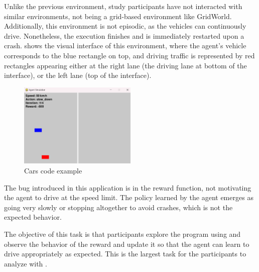 Unlike the previous environment, study participants have not interacted with similar environments, 
not being a grid-based environment like GridWorld. Additionally, this environment is not episodic, as 
the vehicles can continuously drive. Nonetheless, the execution finishes and is immediately restarted 
upon a crash.  shows the visual interface of this environment, where the 
agent's vehicle corresponds to the blue rectangle on top, and driving traffic is represented by red 
rectangles appearing either at the right lane (the driving lane at bottom of the interface), or the left lane 
(top of the interface).

\begin{figure}[hptb]
    \centering
    \includegraphics[width=0.5\textwidth]{figures/cars_example.png}
    \caption{Cars code example}
    \label{fig:cars-code-example}
\end{figure}

The bug introduced in this application is in the reward function, not motivating the agent to drive at 
the speed limit. The policy learned by the agent emerges as going very slowly or stopping altogether 
to avoid crashes, which is not the expected behavior. 

The objective of this task is that participants explore the program using \flik and observe the behavior 
of the reward and update it so that the agent can learn to drive appropriately as expected.
This is the largest task for the participants to analyze with \flik. 


